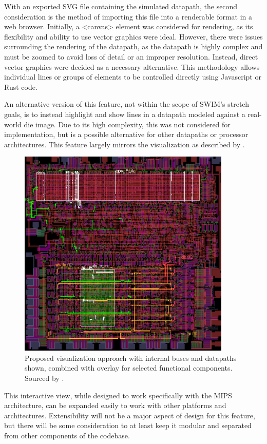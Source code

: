 \documentclass[
    paper=letter,
    parskip=half,
    fontsize=12pt,
    titlepage=firstiscover,
    toc=bibliography,
    numbers=endperiod
]{scrartcl}
\begin{document}
With an exported SVG file containing the simulated datapath, the second
consideration is the method of importing this file into a renderable
format in a web browser. Initially, a \textless canvas\textgreater{}
element was considered for rendering, as its flexibility and ability to
use vector graphics were ideal. However, there were issues surrounding
the rendering of the datapath, as the datapath is highly complex and
must be zoomed to avoid loss of detail or an improper resolution.
Instead, direct vector graphics were decided as a necessary alternative.
This methodology allows individual lines or groups of elements to be
controlled directly using Javascript or Rust code.

An alternative version of this feature, not within the scope of SWIM's
stretch goals, is to instead highlight and show lines in a datapath
modeled against a real-world die image. Due to its high complexity, this
was not considered for implementation, but is a possible alternative for
other datapaths or processor architectures. This feature largely mirrors
the visualization as described by \cite{wojtowicz2015}.

\begin{figure}[H]
    \includegraphics[height=10cm]{wojtowicz-visualization}
    \caption{Proposed visualization approach with internal buses and datapaths shown, combined with overlay for selected functional components. Sourced by \protect\cite[Fig.~2]{wojtowicz2015}.}
\end{figure}

This interactive view, while designed to work specifically with the MIPS
architecture, can be expanded easily to work with other platforms and
architectures. Extensibility will not be a major aspect of design for
this feature, but there will be some consideration to at least keep it
modular and separated from other components of the codebase.
\end{document}
